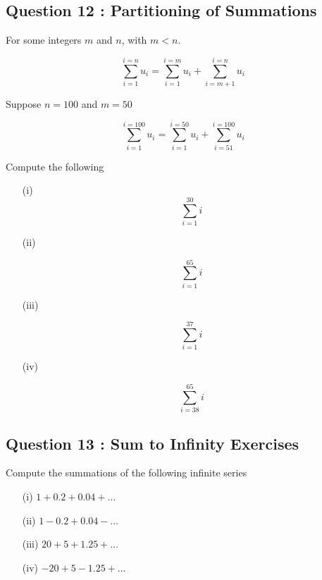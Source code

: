 \documentclass[]{article}
\begin{document}
\newpage


\subsection*{Question 12 : Partitioning of Summations}
\begin{framed}
	
	For some integers $m$ and $n$, with $m<n$.
	
	\[ \sum^{i=n}_{i=1} u_{i} = \sum^{i=m}_{i=1} u_{i} + \sum^{i=n}_{i=m+1} u_{i}\]
	
	Suppose $n=100$ and $m=50$
	
	\[ \sum^{i=100}_{i=1} u_{i} = \sum^{i=50}_{i=1} u_{i} + \sum^{i=100}_{i=51} u_{i}\]
	
\end{framed}
\newpage

\noindent Compute the following 

\begin{multicols}{2}
	\begin{itemize}
		
		
		\item[(i)]	\[ \sum_{i=1}^{30} i \]
		\item[(ii)]  
		
		\[ \sum_{i=1}^{65} i \]
		
		\item [(iii)] 
		
		\[ \sum_{i=1}^{37} i \]
		
		
		\item [(iv)] 
		
		\[ \sum_{i=38}^{65} i \]
		
	\end{itemize}
\end{multicols}




\subsection*{Question 13 : Sum to Infinity Exercises}
Compute the summations of the following infinite series
\begin{multicols}{2}
	\begin{itemize}
		\item[(i)] $1 + 0.2 + 0.04 + \ldots$
		\item[(ii)] $1 - 0.2 + 0.04 - \ldots$
		
		\item[(iii)] $20 + 5 + 1.25 + \ldots$
		\item[(iv)] $- 20 + 5 - 1.25 + \ldots$
	\end{itemize} 
\end{multicols}
\bigskip
\end{document}
